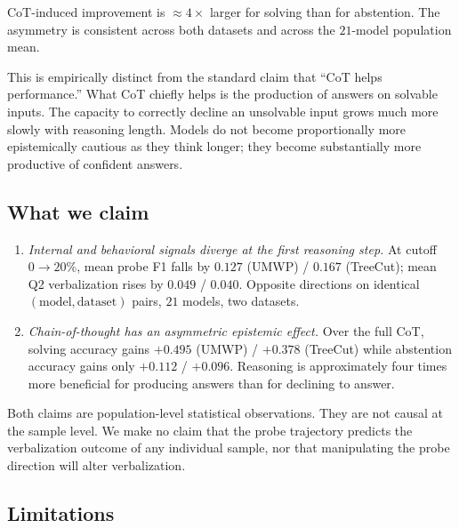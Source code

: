 CoT-induced improvement is $\approx 4\times$ larger for solving than for
abstention. The asymmetry is consistent across both datasets and across
the $21$-model population mean.

This is empirically distinct from the standard claim that ``CoT helps
performance.'' What CoT chiefly helps is the production of answers on
solvable inputs. The capacity to correctly decline an unsolvable input
grows much more slowly with reasoning length. Models do not become
proportionally more epistemically cautious as they think longer; they
become substantially more productive of confident answers.

\subsection{What we claim}

\begin{enumerate}
\item \emph{Internal and behavioral signals diverge at the first reasoning
step.} At cutoff $0\!\to\!20\%$, mean probe F1 falls by $0.127$ (UMWP) /
$0.167$ (TreeCut); mean Q2 verbalization rises by $0.049$ / $0.040$.
Opposite directions on identical $(\text{model}, \text{dataset})$ pairs,
$21$ models, two datasets.

\item \emph{Chain-of-thought has an asymmetric epistemic effect.}
Over the full CoT, solving accuracy gains $+0.495$ (UMWP) / $+0.378$
(TreeCut) while abstention accuracy gains only $+0.112$ / $+0.096$.
Reasoning is approximately four times more beneficial for producing
answers than for declining to answer.
\end{enumerate}

Both claims are population-level statistical observations. They are not
causal at the sample level. We make no claim that the probe trajectory
predicts the verbalization outcome of any individual sample, nor that
manipulating the probe direction will alter verbalization.

\subsection{Limitations}

